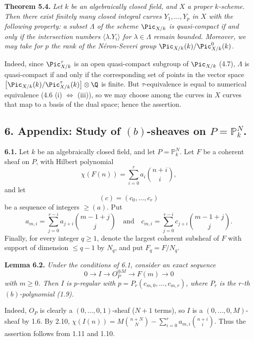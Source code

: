 \textbf{Theorem 5.4.} \emph{Let \(k\) be an algebraically closed field, and \(X\) a proper \(k\)-scheme. Then there exist finitely many closed integral curves \(Y_1,\ldots,Y_p\) in \(X\) with the following property: a subset \(\Lambda\) of the scheme \(\Pic_{X/k}\) is quasi-compact if and only if the intersection numbers \(\langle\lambda.Y_i\rangle\) for \(\lambda\in\Lambda\) remain bounded. Moreover, we may take for \(p\) the rank of the N\'eron-Severi group \(\Pic_{X/k}(k)/\Pic^0_{X/k}(k)\).}

Indeed, since \(\Pic^\tau_{X/k}\) is an open quasi-compact subgroup of \(\Pic_{X/k}\) (4.7), \(\Lambda\) is quasi-compact if and only if the corresponding set of points in the vector space \(\bigl[\Pic_{X/k}(k)/\Pic^\tau_{X/k}(k)\bigr]\otimes\Q\) is finite. But \(\tau\)-equivalence is equal to numerical equivalence (4.6 (i) \(\Longleftrightarrow\) (iii)), so we may choose among the curves in \(X\) curves that map to a basis of the dual space; hence the assertion.

%
\subsection*{6. Appendix: Study of $(b)$-sheaves on $P=\mathbb P^N_k$.}

\textbf{6.1.} Let $k$ be an algebraically closed field, and let $P=\mathbb P^N_k$. Let $F$ be a coherent sheaf on $P$, with Hilbert polynomial
\[
   \chi(F(n))=\sum_{i=0}^{r} a_i \binom{n+i}{i},
\]
and let
\[
   (c)=(c_0,\ldots,c_r)
\]
be a sequence of integers $\ge (a)$. Put
\[
   a_{m,i}=\sum_{j=0}^{r-i}a_{j+i}\binom{m-1+j}{j}\quad\text{and}\quad c_{m,i}=\sum_{j=0}^{r-i}c_{j+i}\binom{m-1+j}{j}.
\]
Finally, for every integer $q\ge1$, denote the largest coherent subsheaf of $F$ with support of dimension $\le q-1$ by $N_q$, and put $F_q=F/N_q$.

\textbf{Lemma 6.2.} \emph{Under the conditions of 6.1, consider an exact sequence}
\[
   0\longrightarrow I\longrightarrow {O}_P^{\oplus M}\longrightarrow F(m)\longrightarrow0
\]
\emph{with $m\ge0$. Then $I$ is $p$-regular with \(p=P_r(c_{m,0},\ldots,c_{m,r})\), where $P_r$ is the $r$-th $(b)$-polynomial (1.9).}

Indeed, ${O}_P$ is clearly a $(0,\ldots,0,1)$-sheaf ($N+1$ terms), so $I$ is a $(0,\ldots,0,M)$-sheaf by 1.6. By 2.10, \(\chi(I(n))=M\binom{n+N}{N}-\sum_{i=0}^{r} a_{m,i}\binom{n+i}{i}\). Thus the assertion follows from 1.11 and 1.10.

